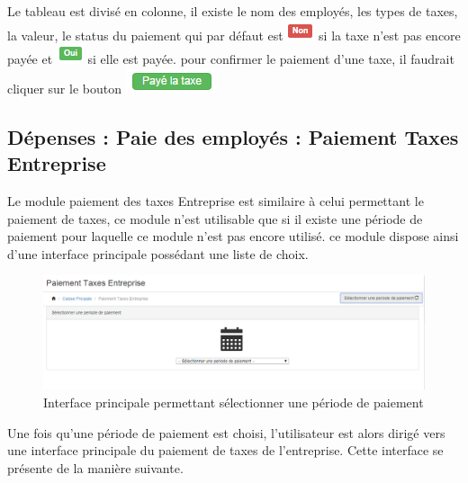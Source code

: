 \documentclass[12pt,a4paper]{report}
\begin{document}
Le tableau est divisé en colonne, il existe le nom des employés, les types de taxes, la valeur, le status du paiement qui par défaut est \includegraphics[scale=0.7]{pic/NonTaxes.png} si la taxe n'est pas encore payée et \includegraphics[scale=0.7]{pic/OuiTaxes.png} si elle est payée. pour confirmer le paiement d'une taxe, il faudrait cliquer sur le bouton \includegraphics[scale=0.7]{pic/PayeTaxe.png}
\newpage
\subsection{Dépenses : Paie des employés : Paiement Taxes Entreprise}
Le module paiement des taxes Entreprise est similaire à celui permettant le paiement de taxes,  ce module n'est utilisable que si il existe une période de paiement pour laquelle ce module n'est pas encore utilisé. ce module dispose ainsi d'une interface principale possédant une liste de choix.

\begin{figure}[h]
\begin{center}
\includegraphics[width=14cm]{pic/PaieTaxesEntre.png}
\end{center}
\caption{Interface principale permettant sélectionner une période de paiement}
\label{Interface principale permettant sélectionner une période de paiement}
\end{figure}

Une fois qu'une période de paiement est choisi, l'utilisateur est alors dirigé vers une interface principale du paiement de taxes de l'entreprise. Cette interface se présente de la manière suivante.
\end{document}
